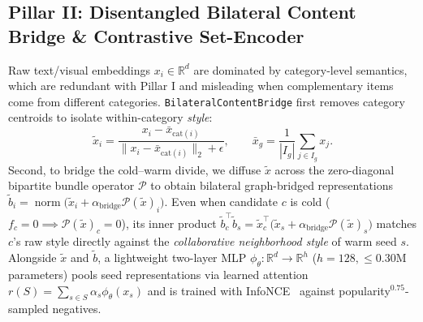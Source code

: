 \subsection{Pillar II: Disentangled Bilateral Content Bridge \& Contrastive Set-Encoder}
\label{sec:bridge-method}
\label{sec:reasoner}
Raw text/visual embeddings $x_i \in \mathbb{R}^d$ are dominated by category-level semantics, which are redundant
with Pillar I and misleading when complementary items come from different categories.
\texttt{BilateralContentBridge} first removes category centroids to isolate within-category \emph{style}:
\begin{equation}
  \tilde{x}_i = \frac{x_i - \bar{x}_{\text{cat}(i)}}{\lVert x_i - \bar{x}_{\text{cat}(i)}\rVert_2 + \epsilon},
  \qquad \bar{x}_g = \frac{1}{|I_g|}\sum_{j\in I_g} x_j.
  \label{eq:disentangle}
\end{equation}
Second, to bridge the cold--warm divide, we diffuse $\tilde{x}$ across the zero-diagonal bipartite bundle operator
$\mathcal{P}$ to obtain bilateral graph-bridged representations $\tilde{b}_i = \operatorname{norm}\big(\tilde{x}_i
+ \alpha_{\text{bridge}}\mathcal{P}(\tilde{x})_i\big)$. Even when candidate $c$ is cold ($f_c=0 \implies
\mathcal{P}(\tilde{x})_c = 0$), its inner product $\tilde{b}_c^{\!\top}\tilde{b}_s = \tilde{x}_c^{\!\top}\big(\tilde{x}_s
+ \alpha_{\text{bridge}}\mathcal{P}(\tilde{x})_s\big)$ matches $c$'s raw style directly against the \emph{collaborative
neighborhood style} of warm seed $s$. Alongside $\tilde{x}$ and $\tilde{b}$, a lightweight two-layer MLP
$\phi_\theta:\mathbb{R}^d\to\mathbb{R}^h$ ($h=128, \le 0.30\text{M}$ parameters) pools seed representations via
learned attention $r(S) = \sum_{s\in S}\alpha_s \phi_\theta(x_s)$ and is trained with InfoNCE~\cite{infonce} against
popularity$^{0.75}$-sampled negatives.

